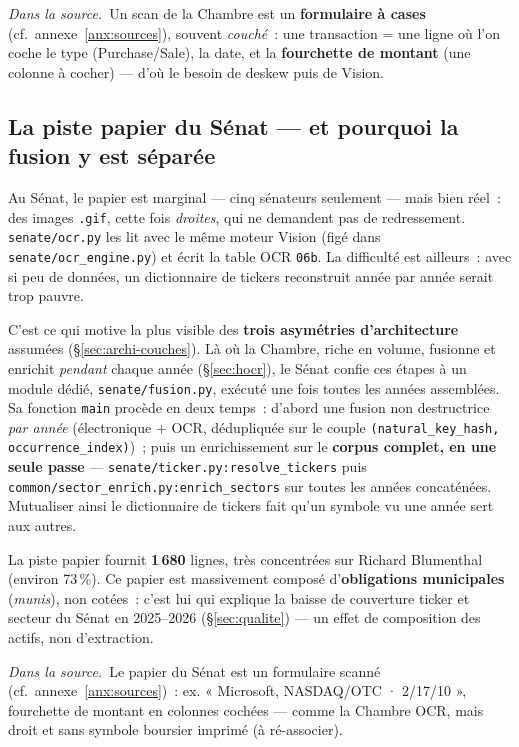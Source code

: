 \documentclass[11pt,a4paper]{article}
\newcommand{\co}[1]{\texttt{\small #1}}
\newcommand{\srcex}[1]{\par\smallskip\noindent{\color{black!55}\rule{2pt}{\baselineskip}}\hspace{6pt}\begin{minipage}{\dimexpr\linewidth-16pt}\small\textit{Dans la source.}\ #1\end{minipage}\par\smallskip}
\begin{document}
\srcex{Un scan de la Chambre est un \textbf{formulaire à cases} (cf.~annexe~\ref{anx:sources}), souvent
\emph{couché}~: une transaction = une ligne où l'on coche le type (Purchase/Sale), la date, et la
\textbf{fourchette de montant} (une colonne à cocher) — d'où le besoin de deskew puis de Vision.}

\subsection{La piste papier du Sénat — et pourquoi la fusion y est séparée}
\label{sec:socr}
Au Sénat, le papier est marginal — cinq sénateurs seulement — mais bien réel~: des images \co{.gif}, cette
fois \emph{droites}, qui ne demandent pas de redressement. \co{senate/ocr.py} les lit avec le même moteur
Vision (figé dans \co{senate/ocr_engine.py}) et écrit la table OCR \co{06b}. La difficulté est ailleurs~:
avec si peu de données, un dictionnaire de tickers reconstruit année par année serait trop pauvre.

C'est ce qui motive la plus visible des \textbf{trois asymétries d'architecture} assumées
(§\ref{sec:archi-couches}). Là où la Chambre, riche en volume, fusionne et enrichit \emph{pendant} chaque
année (§\ref{sec:hocr}), le Sénat confie ces étapes à un module dédié, \co{senate/fusion.py}, exécuté une
fois toutes les années assemblées.
Sa fonction \co{main} procède en deux temps~: d'abord une fusion non destructrice \emph{par année}
(électronique + OCR, dédupliquée sur le couple \co{(natural_key_hash, occurrence_index)})~; puis un
enrichissement sur le \textbf{corpus complet, en une seule passe} — \co{senate/ticker.py:resolve_tickers}
puis \co{common/sector_enrich.py:enrich_sectors} sur toutes les années concaténées. Mutualiser ainsi le
dictionnaire de tickers fait qu'un symbole vu une année sert aux autres.

La piste papier fournit \textbf{1\,680} lignes, très concentrées sur Richard Blumenthal (environ 73\,\%). Ce
papier est massivement composé d'\textbf{obligations municipales} (\emph{munis}), non cotées~: c'est lui qui
explique la baisse de couverture ticker et secteur du Sénat en 2025--2026 (§\ref{sec:qualite}) — un effet de
composition des actifs, non d'extraction.

\srcex{Le papier du Sénat est un formulaire scanné (cf.~annexe~\ref{anx:sources})~: ex. « Microsoft,
NASDAQ/OTC · 2/17/10 », fourchette de montant en colonnes cochées — comme la Chambre OCR, mais droit et
sans symbole boursier imprimé (à ré-associer).}
\end{document}
